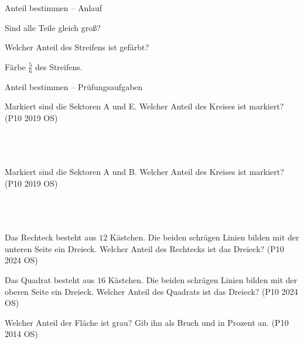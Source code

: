 \setcounter{aufgabe}{10}

\begin{aufgabe}{Anteil bestimmen – Anlauf}
\begin{teile}
\teil Sind alle Teile gleich groß? \janein

\teil Welcher Anteil des Streifens ist gefärbt?

\leerfeld
\teil Färbe $\frac{5}{6}$ des Streifens.

\end{teile}
\end{aufgabe}

\begin{aufgabe}{Anteil bestimmen – Prüfungsaufgaben}
\begin{teile}
\teil Markiert sind die Sektoren A und E. Welcher Anteil des Kreises ist markiert? \hfill (P10 2019 OS)\\ \\ \\ \\ 

\teil Markiert sind die Sektoren A und B. Welcher Anteil des Kreises ist markiert? \hfill (P10 2019 OS)\\ \\ \\ \\ 

\teil Das Rechteck besteht aus $12$ Kästchen. Die beiden schrägen Linien bilden mit der unteren Seite ein Dreieck. Welcher Anteil des Rechtecks ist das Dreieck? \hfill (P10 2024 OS) \\

\begin{ksys}[xmin=0,xmax=6,ymin=0,ymax=2,ablesen]   \end{ksys}
\leerfeld
\teil Das Quadrat besteht aus $16$ Kästchen. Die beiden schrägen Linien bilden mit der oberen Seite ein Dreieck. Welcher Anteil des Quadrats ist das Dreieck? \hfill (P10 2024 OS) \\

\begin{ksys}[xmin=0,xmax=4,ymin=0,ymax=4,ablesen]   \end{ksys}
\leerfeld
\teil Welcher Anteil der Fläche ist grau? Gib ihn als Bruch und in Prozent an. \hfill (P10 2014 OS) \\


\end{teile}
\end{aufgabe}
